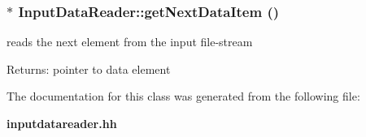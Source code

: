 \subsubsection[getNextDataItem]{$\ast$ InputDataReader::getNextDataItem ()\hspace{0.3cm}{\tt  [protected]}}\label{classInputDataReader_b1f6fbe3be17deac62fd3e705ef0c1f1}


reads the next element from the input file-stream \begin{Desc}
\item[Returns:]pointer to data element \end{Desc}


The documentation for this class was generated from the following file:\begin{CompactItemize}
\item 
{\bf inputdatareader.hh}\end{CompactItemize}
